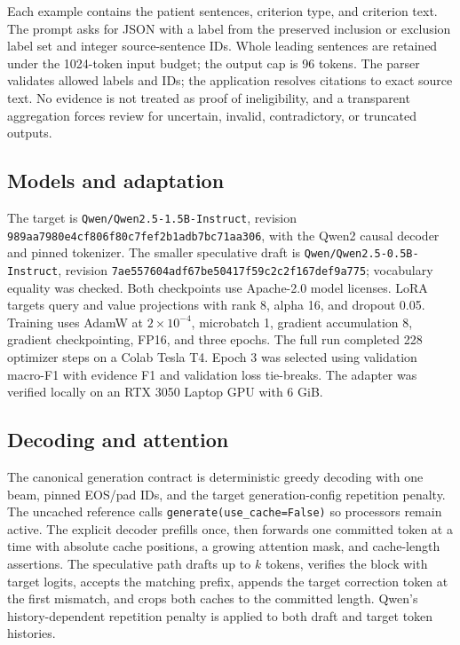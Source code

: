 ﻿\documentclass[conference]{IEEEtran}
\begin{document}
Each example contains the patient sentences, criterion type, and criterion text. The prompt asks for JSON with a label from the preserved inclusion or exclusion label set and integer source-sentence IDs. Whole leading sentences are retained under the 1024-token input budget; the output cap is 96 tokens. The parser validates allowed labels and IDs; the application resolves citations to exact source text. No evidence is not treated as proof of ineligibility, and a transparent aggregation forces review for uncertain, invalid, contradictory, or truncated outputs.

\subsection{Models and adaptation}
The target is \texttt{Qwen/Qwen2.5-1.5B-Instruct}, revision \texttt{989aa7980e4cf806f80c7fef2b1adb7bc71aa306}, with the Qwen2 causal decoder and pinned tokenizer. The smaller speculative draft is \texttt{Qwen/Qwen2.5-0.5B-Instruct}, revision \texttt{7ae557604adf67be50417f59c2c2f167def9a775}; vocabulary equality was checked. Both checkpoints use Apache-2.0 model licenses. LoRA targets query and value projections with rank 8, alpha 16, and dropout 0.05. Training uses AdamW at $2\times10^{-4}$, microbatch 1, gradient accumulation 8, gradient checkpointing, FP16, and three epochs. The full run completed 228 optimizer steps on a Colab Tesla T4. Epoch 3 was selected using validation macro-F1 with evidence F1 and validation loss tie-breaks. The adapter was verified locally on an RTX 3050 Laptop GPU with 6 GiB.

\subsection{Decoding and attention}
The canonical generation contract is deterministic greedy decoding with one beam, pinned EOS/pad IDs, and the target generation-config repetition penalty. The uncached reference calls \texttt{generate(use\_cache=False)} so processors remain active. The explicit decoder prefills once, then forwards one committed token at a time with absolute cache positions, a growing attention mask, and cache-length assertions. The speculative path drafts up to $k$ tokens, verifies the block with target logits, accepts the matching prefix, appends the target correction token at the first mismatch, and crops both caches to the committed length. Qwen's history-dependent repetition penalty is applied to both draft and target token histories.
\end{document}
